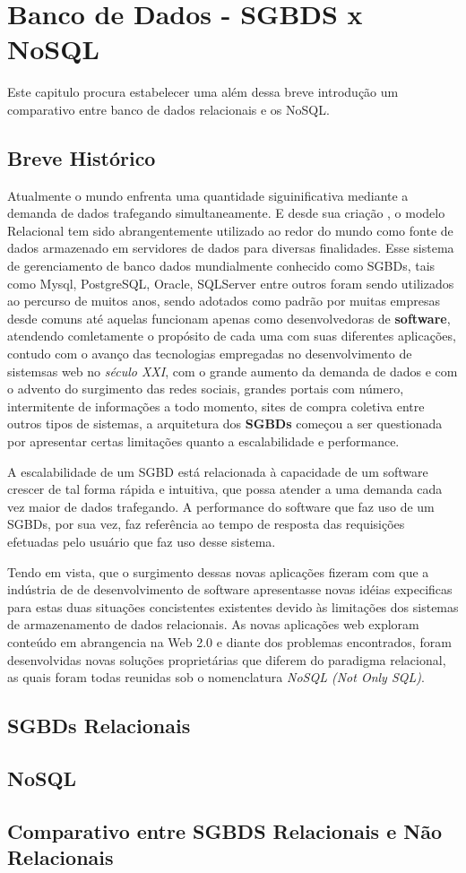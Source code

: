 \chapter{Banco de Dados - SGBDS x NoSQL}
\thispagestyle{empty}
Este capitulo procura estabelecer uma além dessa breve introdução um comparativo entre banco de dados relacionais e os NoSQL.

\section{Breve Histórico}
Atualmente o mundo enfrenta uma quantidade siguinificativa mediante a demanda de dados trafegando simultaneamente. E desde sua criação
\cite{CODD}, o modelo Relacional tem sido abrangentemente utilizado ao redor do mundo como fonte de dados armazenado em servidores de dados para diversas
finalidades. Esse sistema de gerenciamento de banco dados mundialmente conhecido como SGBDs, tais como Mysql, PostgreSQL, Oracle, SQLServer entre outros
foram sendo utilizados ao percurso de muitos anos, sendo adotados como padrão por muitas empresas desde comuns até aquelas funcionam apenas como desenvolvedoras
de \textbf{software}, atendendo comletamente o propósito de cada uma com suas diferentes aplicações, contudo com o avanço das tecnologias empregadas no desenvolvimento
de sistemsas web no \textit{século XXI}, com o grande aumento da demanda de dados e com o advento do surgimento das redes sociais, grandes portais com número, intermitente de 
informações a todo momento, sites de compra coletiva entre outros tipos de sistemas, a arquitetura dos \textbf{SGBDs} começou a ser questionada por apresentar certas limitações 
quanto a escalabilidade e performance.

A escalabilidade de um SGBD está relacionada à capacidade de um software crescer de tal forma rápida e intuitiva, que possa atender a uma demanda cada vez maior de 
dados trafegando. A performance do software que faz uso de um SGBDs, por sua vez, faz referência ao tempo de resposta das requisições efetuadas pelo usuário que faz uso desse sistema.

Tendo em vista, que o surgimento dessas novas aplicações fizeram com que a indústria de de desenvolvimento de software apresentasse novas idéias expecificas para estas duas situações concistentes
existentes devido às limitações dos sistemas de armazenamento de dados relacionais. As novas aplicações web exploram conteúdo em abrangencia na Web 2.0 e diante dos problemas encontrados, foram 
desenvolvidas novas soluções proprietárias \cite{CUNHA} que diferem do paradigma relacional, as quais foram todas reunidas sob o nomenclatura \textit{NoSQL (Not Only SQL)}.


\section{SGBDs Relacionais}

\section{NoSQL}

\section{Comparativo entre SGBDS Relacionais e Não Relacionais}
